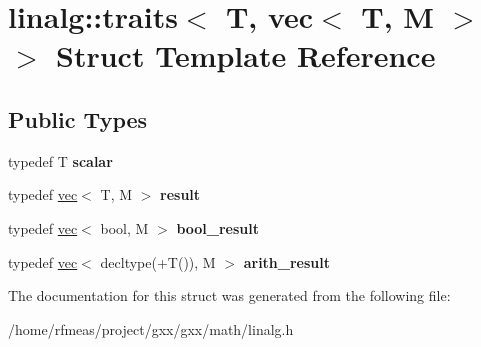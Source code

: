 \hypertarget{structlinalg_1_1traits_3_01T_00_01vec_3_01T_00_01M_01_4_01_4}{}\section{linalg\+:\+:traits$<$ T, vec$<$ T, M $>$ $>$ Struct Template Reference}
\label{structlinalg_1_1traits_3_01T_00_01vec_3_01T_00_01M_01_4_01_4}
\subsection*{Public Types}
\begin{DoxyCompactItemize}
\item 
typedef T {\bfseries scalar}\hypertarget{structlinalg_1_1traits_3_01T_00_01vec_3_01T_00_01M_01_4_01_4_a3d681a9c7c7da799ab749d6cb44ca3bf}{}\label{structlinalg_1_1traits_3_01T_00_01vec_3_01T_00_01M_01_4_01_4_a3d681a9c7c7da799ab749d6cb44ca3bf}

\item 
typedef \hyperlink{structlinalg_1_1vec}{vec}$<$ T, M $>$ {\bfseries result}\hypertarget{structlinalg_1_1traits_3_01T_00_01vec_3_01T_00_01M_01_4_01_4_aeafef5477ee8f22ee90470156ed8fe19}{}\label{structlinalg_1_1traits_3_01T_00_01vec_3_01T_00_01M_01_4_01_4_aeafef5477ee8f22ee90470156ed8fe19}

\item 
typedef \hyperlink{structlinalg_1_1vec}{vec}$<$ bool, M $>$ {\bfseries bool\+\_\+result}\hypertarget{structlinalg_1_1traits_3_01T_00_01vec_3_01T_00_01M_01_4_01_4_a75b61423a32126017ba29581ba38bdef}{}\label{structlinalg_1_1traits_3_01T_00_01vec_3_01T_00_01M_01_4_01_4_a75b61423a32126017ba29581ba38bdef}

\item 
typedef \hyperlink{structlinalg_1_1vec}{vec}$<$ decltype(+T()), M $>$ {\bfseries arith\+\_\+result}\hypertarget{structlinalg_1_1traits_3_01T_00_01vec_3_01T_00_01M_01_4_01_4_a54b18417f15ee1b1267cd46545a9f678}{}\label{structlinalg_1_1traits_3_01T_00_01vec_3_01T_00_01M_01_4_01_4_a54b18417f15ee1b1267cd46545a9f678}

\end{DoxyCompactItemize}


The documentation for this struct was generated from the following file\+:\begin{DoxyCompactItemize}
\item 
/home/rfmeas/project/gxx/gxx/math/linalg.\+h\end{DoxyCompactItemize}
